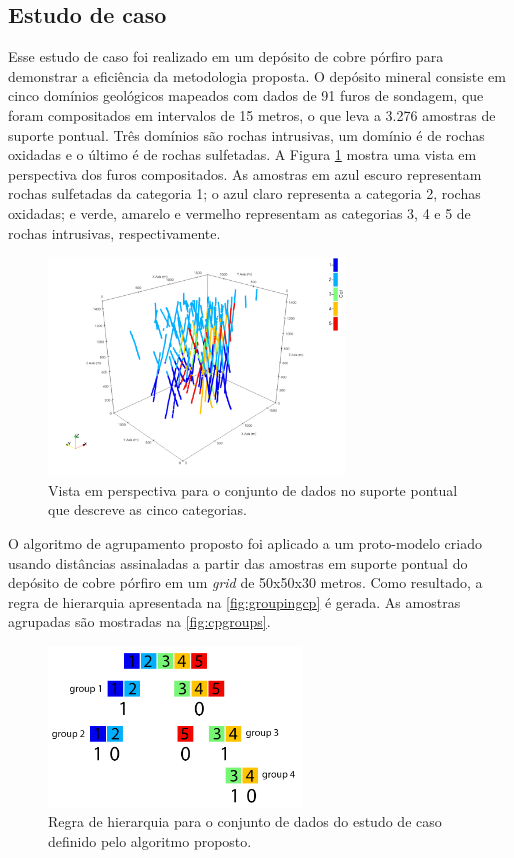 \subsection{Estudo de caso}\label{estudo_cobre}

Esse estudo de caso foi realizado em um depósito de cobre pórfiro para demonstrar a eficiência da metodologia proposta. O depósito mineral consiste em cinco domínios geológicos mapeados com dados de 91 furos de sondagem, que foram compositados em intervalos de 15 metros, o que leva a 3.276 amostras de suporte pontual. Três domínios são rochas intrusivas, um domínio é de rochas oxidadas e o último é de rochas sulfetadas. A Figura \ref{fig:pointscp} mostra uma vista em perspectiva dos furos compositados. As amostras em azul escuro representam rochas sulfetadas da categoria 1; o azul claro representa a categoria 2, rochas oxidadas; e verde, amarelo e vermelho representam as categorias 3, 4 e 5 de rochas intrusivas, respectivamente.

\begin{figure}[H]
\caption{Vista em perspectiva para o conjunto de dados no suporte pontual que descreve as cinco categorias.}
\label{fig:pointscp}
\centering
\includegraphics[width=0.7\textwidth]{capitulo_3/imagens/pointscp.png}
\end{figure}

O algoritmo de agrupamento proposto foi aplicado a um proto-modelo criado usando distâncias assinaladas a partir das amostras em suporte pontual do depósito de cobre pórfiro em um \textit{grid} de 50x50x30 metros. Como resultado, a regra de hierarquia apresentada na \autoref{fig:groupingcp} é gerada. As amostras agrupadas são mostradas na \autoref{fig:cpgroups}.

\begin{figure}[H]
\caption{Regra de hierarquia para o conjunto de dados do estudo de caso definido pelo algoritmo proposto.}
\label{fig:groupingcp}
\centering
\includegraphics[width=0.6\textwidth]{capitulo_3/imagens/groupingcp.png}
\end{figure}

